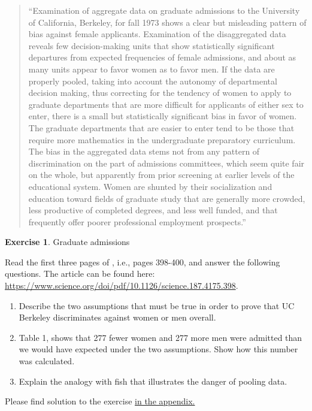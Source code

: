 \documentclass[
  12pt,
  oneside]{book}
\providecommand{\tightlist}{%
  \setlength{\itemsep}{0pt}\setlength{\parskip}{0pt}}
\theoremstyle{definition}
\theoremstyle{definition}
\theoremstyle{definition}
\newtheorem{exercise}{Exercise}[chapter]
\theoremstyle{definition}
\theoremstyle{remark}
\begin{document}
\begin{quote}
``Examination of aggregate data on graduate admissions to the University of California, Berkeley, for fall 1973 shows a clear but misleading pattern of bias against female applicants. Examination of the disaggregated data reveals few decision-making units that show statistically significant departures from expected frequencies of female admissions, and about as many units appear to favor women as to favor men. If the data are properly pooled, taking into account the autonomy of departmental decision making, thus correcting for the tendency of women to apply to graduate departments that are more difficult for applicants of either sex to enter, there is a small but statistically significant bias in favor of women. The graduate departments that are easier to enter tend to be those that require more mathematics in the undergraduate preparatory curriculum. The bias in the aggregated data stems not from any pattern of discrimination on the part of admissions committees, which seem quite fair on the whole, but apparently from prior screening at earlier levels of the educational system. Women are shunted by their socialization and education toward fields of graduate study that are generally more crowded, less productive of completed degrees, and less well funded, and that frequently offer poorer professional employment prospects.''
\end{quote}

\begin{exercise}
\protect\hypertarget{exr:graduateadmission}{}\label{exr:graduateadmission}Graduate admissions

Read the first three pages of \citet{Bickel1975Sex}, i.e., pages 398-400, and answer the following questions. The article can be found here: \url{https://www.science.org/doi/pdf/10.1126/science.187.4175.398}.

\begin{enumerate}
\def\labelenumi{\alph{enumi})}
\tightlist
\item
  Describe the two assumptions that must be true in order to prove that UC Berkeley discriminates against women or men overall.
\item
  Table 1, shows that 277 fewer women and 277 more men were admitted than we would have expected under the two assumptions. Show how this number was calculated.
\item
  Explain the analogy with fish that illustrates the danger of pooling data.
\end{enumerate}

Please find solution to the exercise \protect\hyperlink{sol:graduateadmission}{in the appendix.}
\end{exercise}
\end{document}
